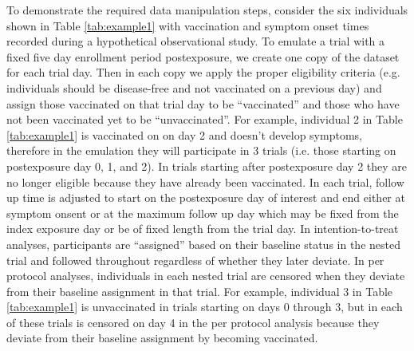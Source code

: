 \begin{appendix}
    To demonstrate the required data manipulation steps, consider the six individuals shown in Table \ref{tab:example1} with vaccination and symptom onset times recorded during a hypothetical observational study. To emulate a trial with a fixed five day enrollment period postexposure, we create one copy of the dataset for each trial day. Then in each copy we apply the proper eligibility criteria (e.g. individuals should be disease-free and not vaccinated on a previous day) and assign those vaccinated on that trial day to be ``vaccinated'' and those who have not been vaccinated yet to be ``unvaccinated''. For example, individual 2 in Table \ref{tab:example1} is vaccinated on on day 2 and doesn't develop symptoms, therefore in the emulation they will participate in 3 trials (i.e. those starting on postexposure day 0, 1, and 2). In trials starting after postexposure day 2 they are no longer eligible because they have already been vaccinated. In each trial, follow up time is adjusted to start on the postexposure day of interest and end either at symptom onsent or at the maximum follow up day which may be fixed from the index exposure day or be of fixed length from the trial day. In intention-to-treat analyses, participants are ``assigned'' based on their baseline status in the nested trial and followed throughout regardless of whether they later deviate. In per protocol analyses, individuals in each nested trial are censored when they deviate from their baseline assignment in that trial. For example, individual 3 in Table \ref{tab:example1} is unvaccinated in trials starting on days 0 through 3, but in each of these trials is censored on day 4 in the per protocol analysis because they deviate from their baseline assignment by becoming vaccinated.
    

\end{appendix}

